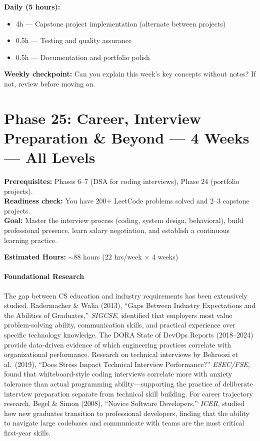 \documentclass[11pt, a4paper, oneside]{report}
\begin{document}
\begin{practicebox}
\textbf{Daily (5 hours):}
\begin{itemize}[leftmargin=*]
\item 4h --- Capstone project implementation (alternate between projects)
\item 0.5h --- Testing and quality assurance
\item 0.5h --- Documentation and portfolio polish
\end{itemize}


\textbf{Weekly checkpoint:} Can you explain this week's key concepts without notes? If not, review before moving on.
\end{practicebox}

\clearpage
\section[Phase 25: Career \& Interviews]{Phase 25: Career, Interview Preparation \& Beyond --- 4 Weeks --- All Levels}

\begin{prereqbox}
\textbf{Prerequisites:} Phases 6--7 (DSA for coding interviews), Phase 24 (portfolio projects).\\
\textbf{Readiness check:} You have 200+ LeetCode problems solved and 2--3 capstone projects.\\
\textbf{Goal:} Master the interview process (coding, system design, behavioral), build professional presence, learn salary negotiation, and establish a continuous learning practice.


\textbf{Estimated Hours:} $\sim$88 hours (22 hrs/week $\times$ 4 weeks)
\end{prereqbox}


\paragraph{Foundational Research} The gap between CS education and industry requirements has been extensively studied. Radermacher \& Walia (2013), ``Gaps Between Industry Expectations and the Abilities of Graduates,'' \emph{SIGCSE}, identified that employers most value problem-solving ability, communication skills, and practical experience over specific technology knowledge. The DORA State of DevOps Reports (2018--2024) provide data-driven evidence of which engineering practices correlate with organizational performance. Research on technical interviews by Behroozi et al.\ (2019), ``Does Stress Impact Technical Interview Performance?'' \emph{ESEC/FSE}, found that whiteboard-style coding interviews correlate more with anxiety tolerance than actual programming ability---supporting the practice of deliberate interview preparation separate from technical skill building. For career trajectory research, Begel \& Simon (2008), ``Novice Software Developers,'' \emph{ICER}, studied how new graduates transition to professional developers, finding that the ability to navigate large codebases and communicate with teams are the most critical first-year skills.
\end{document}

